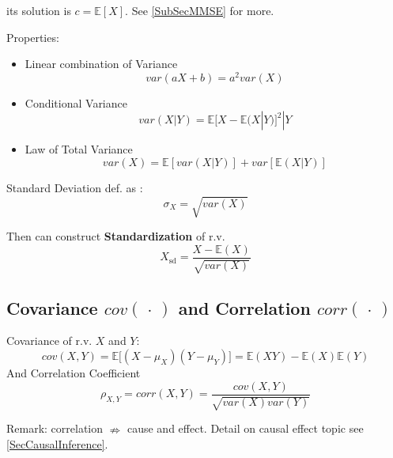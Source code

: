     its solution is $ c=\mathbb{E}\left[ X \right]  $. See \autoref{SubSecMMSE} for more.

\begin{point}
    Properties:
\end{point}

\begin{itemize} 
    \item Linear combination of Variance\begin{equation}
        var(aX+b)=a^2var(X)
    \end{equation}
    \item Conditional Variance
    \begin{equation}
        var(X|Y)=\mathbb{E}{[X-\mathbb{E}(X|Y)]^2|Y}
    \end{equation}
    \item Law of Total Variance\begin{equation}
        var(X)=\mathbb{E}[var(X|Y)]+var[\mathbb{E}(X|Y)]
    \end{equation}
\end{itemize}

    Standard Deviation def. as :
    \begin{equation}\sigma_X=\sqrt{var(X)}\end{equation}

    Then can construct \textbf{Standardization} of r.v.
    \begin{equation}X_\mathrm{sd} =\frac{X-\mathbb{E}(X)}{\sqrt{var(X)}}\end{equation}


\subsection{Covariance $ cov(\, \cdot \, ) $ and Correlation $ corr(\, \cdot \, ) $}\label{SubSubSectionCovarianceAndCorrelation}
    Covariance of r.v. $X$ and $Y$:\begin{equation}
        cov(X,Y)=\mathbb{E}\big[(X-\mu_X)(Y-\mu_Y)\big]=\mathbb{E}(XY)-\mathbb{E}(X)\mathbb{E}(Y)
    \end{equation}
    And Correlation Coefficient
    \begin{equation}
        \rho_{X,Y}=corr(X,Y)=\frac{cov(X,Y)}{\sqrt{var(X)var(Y)}}
    \end{equation}

    Remark: correlation $\nRightarrow$ cause and effect. 
    Detail on causal effect topic see \autoref{SecCausalInference}.

